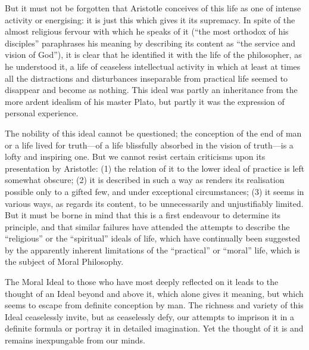 But it must not be forgotten that Aristotle conceives of this life as one of
intense activity or energising: it is just this which gives it its supremacy.
In spite of the almost religious fervour with which he speaks of it (“the
most orthodox of his disciples” paraphrases his meaning by describing its
content as “the service and vision of God”), it is clear that he
identified it with the life of the philosopher, as he understood it, a life of
ceaseless intellectual activity in which at least at times all the distractions
and disturbances inseparable from practical life seemed to disappear and become
as nothing. This ideal was partly an inheritance from the more ardent idealism
of his master Plato, but partly it was the expression of personal experience.

The nobility of this ideal cannot be questioned; the conception of the end of
man or a life lived for truth—of a life blissfully absorbed in the vision
of truth—is a lofty and inspiring one. But we cannot resist certain
criticisms upon its presentation by Aristotle: (1) the relation of it to the
lower ideal of practice is left somewhat obscure; (2) it is described in such a
way as renders its realisation possible only to a gifted few, and under
exceptional circumstances; (3) it seems in various ways, as regards its
content, to be unnecessarily and unjustifiably limited. But it must be borne in
mind that this is a first endeavour to determine its principle, and that
similar failures have attended the attempts to describe the
“religious” or the “spiritual” ideals of life, which
have continually been suggested by the apparently inherent limitations of the
“practical” or “moral” life, which is the subject of
Moral Philosophy.

The Moral Ideal to those who have most deeply reflected on it leads to the
thought of an Ideal beyond and above it, which alone gives it meaning, but
which seems to escape from definite conception by man. The richness and variety
of this Ideal ceaselessly invite, but as ceaselessly defy, our attempts to
imprison it in a definite formula or portray it in detailed imagination. Yet
the thought of it is and remains inexpungable from our minds.

